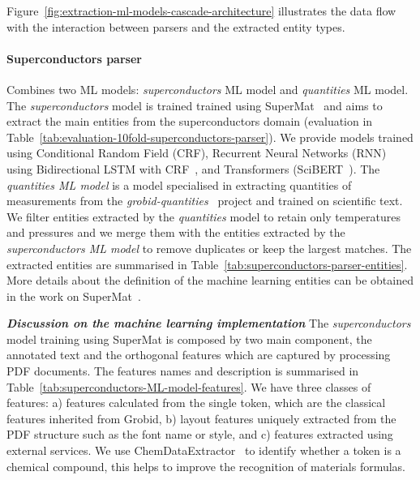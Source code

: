 \documentclass{article}
\begin{document}
Figure~\ref{fig:extraction-ml-models-cascade-architecture} illustrates the data flow with the interaction between parsers and the extracted entity types. 

\paragraph{Superconductors parser}
Combines two ML models: \textit{superconductors} ML model and \textit{quantities} ML model.
The \textit{superconductors} model is trained trained using SuperMat~\cite{foppiano2021supermat} and aims to extract the main entities from the superconductors domain (evaluation in Table~\ref{tab:evaluation-10fold-superconductors-parser}).
We provide models trained using Conditional Random Field (CRF), Recurrent Neural Networks (RNN) using Bidirectional LSTM with CRF~\cite{Lample2016NeuralAF}, and Transformers (SciBERT~\cite{Beltagy2019SciBERT}).
The \textit{quantities ML model} is a model specialised in extracting quantities of measurements from the \textit{grobid-quantities}~\cite{foppiano2019quantities} project and trained on scientific text.
We filter entities extracted by the \textit{quantities} model to retain only temperatures and pressures and we merge them with the entities extracted by the \textit{superconductors ML model} to remove duplicates or keep the largest matches.
The extracted entities are summarised in Table~\ref{tab:superconductors-parser-entities}. More details about the definition of the machine learning entities can be obtained in the work on SuperMat~\cite{foppiano2021supermat}.

\emph{\textbf{Discussion on the machine learning implementation}}
The \textit{superconductors} model training using SuperMat is composed by two main component, the annotated text and the orthogonal features which are captured by processing PDF documents.
The features names and description is summarised in Table~\ref{tab:superconductors-ML-model-features}. 
We have three classes of features: a) features calculated from the single token, which are the classical features inherited from Grobid, b) layout features uniquely extracted from the PDF structure such as the font name or style, and c) features extracted using external services. 
We use ChemDataExtractor~\cite{chemdataextractor1} to identify whether a token is a chemical compound, this helps to improve the recognition of materials formulas. 
\end{document}
